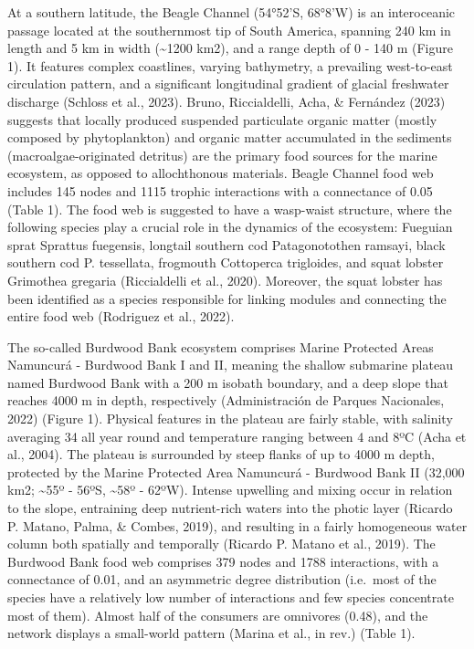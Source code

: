\documentclass[
]{article}
\begin{document}
At a southern latitude, the Beagle Channel (54°52'S, 68°8'W) is an
interoceanic passage located at the southernmost tip of South America,
spanning 240 km in length and 5 km in width (\textasciitilde1200 km2),
and a range depth of 0 - 140 m (Figure 1). It features complex
coastlines, varying bathymetry, a prevailing west-to-east circulation
pattern, and a significant longitudinal gradient of glacial freshwater
discharge (Schloss et al., 2023). Bruno, Riccialdelli, Acha, \&
Fernández (2023) suggests that locally produced suspended particulate
organic matter (mostly composed by phytoplankton) and organic matter
accumulated in the sediments (macroalgae-originated detritus) are the
primary food sources for the marine ecosystem, as opposed to
allochthonous materials. Beagle Channel food web includes 145 nodes and
1115 trophic interactions with a connectance of 0.05 (Table 1). The food
web is suggested to have a wasp-waist structure, where the following
species play a crucial role in the dynamics of the ecosystem: Fueguian
sprat Sprattus fuegensis, longtail southern cod Patagonotothen ramsayi,
black southern cod P. tessellata, frogmouth Cottoperca trigloides, and
squat lobster Grimothea gregaria (Riccialdelli et al., 2020). Moreover,
the squat lobster has been identified as a species responsible for
linking modules and connecting the entire food web (Rodriguez et al.,
2022).

The so-called Burdwood Bank ecosystem comprises Marine Protected Areas
Namuncurá - Burdwood Bank I and II, meaning the shallow submarine
plateau named Burdwood Bank with a 200 m isobath boundary, and a deep
slope that reaches 4000 m in depth, respectively (Administración de
Parques Nacionales, 2022) (Figure 1). Physical features in the plateau
are fairly stable, with salinity averaging 34 all year round and
temperature ranging between 4 and 8ºC (Acha et al., 2004). The plateau
is surrounded by steep flanks of up to 4000 m depth, protected by the
Marine Protected Area Namuncurá - Burdwood Bank II (32,000 km2;
\textasciitilde55º - 56ºS, \textasciitilde58º - 62ºW). Intense upwelling
and mixing occur in relation to the slope, entraining deep nutrient-rich
waters into the photic layer (Ricardo P. Matano, Palma, \& Combes,
2019), and resulting in a fairly homogeneous water column both spatially
and temporally (Ricardo P. Matano et al., 2019). The Burdwood Bank food
web comprises 379 nodes and 1788 interactions, with a connectance of
0.01, and an asymmetric degree distribution (i.e.~most of the species
have a relatively low number of interactions and few species concentrate
most of them). Almost half of the consumers are omnivores (0.48), and
the network displays a small-world pattern (Marina et al., in rev.)
(Table 1).
\end{document}
